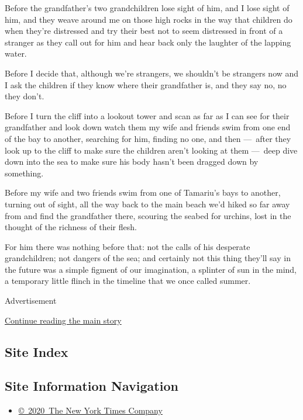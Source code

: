 Before the grandfather's two grandchildren lose sight of him, and I lose
sight of him, and they weave around me on those high rocks in the way
that children do when they're distressed and try their best not to seem
distressed in front of a stranger as they call out for him and hear back
only the laughter of the lapping water.

Before I decide that, although we're strangers, we shouldn't be
strangers now and I ask the children if they know where their
grandfather is, and they say no, no they don't.

Before I turn the cliff into a lookout tower and scan as far as I can
see for their grandfather and look down watch them my wife and friends
swim from one end of the bay to another, searching for him, finding no
one, and then ---~after they look up to the cliff to make sure the
children aren't looking at them ---~deep dive down into the sea to make
sure his body hasn't been dragged down by something.

Before my wife and two friends swim from one of Tamariu's bays to
another, turning out of sight, all the way back to the main beach we'd
hiked so far away from and find the grandfather there, scouring the
seabed for urchins, lost in the thought of the richness of their flesh.

For him there was nothing before that: not the calls of his desperate
grandchildren; not dangers of the sea; and certainly not this thing
they'll say in the future was a simple figment of our imagination, a
splinter of sun in the mind, a temporary little flinch in the timeline
that we once called summer.

Advertisement

\protect\hyperlink{after-bottom}{Continue reading the main story}

\hypertarget{site-index}{%
\subsection{Site Index}\label{site-index}}

\hypertarget{site-information-navigation}{%
\subsection{Site Information
Navigation}\label{site-information-navigation}}

\begin{itemize}
\tightlist
\item
  \href{https://help.nytimes3xbfgragh.onion/hc/en-us/articles/115014792127-Copyright-notice}{©~2020~The
  New York Times Company}
\end{itemize}

